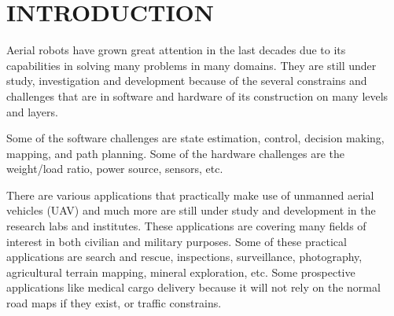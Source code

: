 





\section{INTRODUCTION}

Aerial robots have grown great attention in the last decades due to its capabilities in solving many problems in many domains. They are still under study, investigation and development because of the several constrains and challenges that are in software and hardware of its construction on  many levels and layers. 

Some of the software challenges are state estimation, control, decision making, mapping, and path planning. Some of the hardware challenges are the weight/load ratio, power source, sensors, etc. 

There are various applications that practically make use of unmanned aerial vehicles (UAV) and much more are still under study and development in the research labs and institutes. These applications are covering many fields of interest in both civilian and military purposes. Some of these practical applications are search and rescue, inspections, surveillance, photography, agricultural terrain mapping, mineral exploration, etc. Some prospective applications like medical cargo delivery because it will not rely on the normal road maps if they exist, or traffic constrains.

